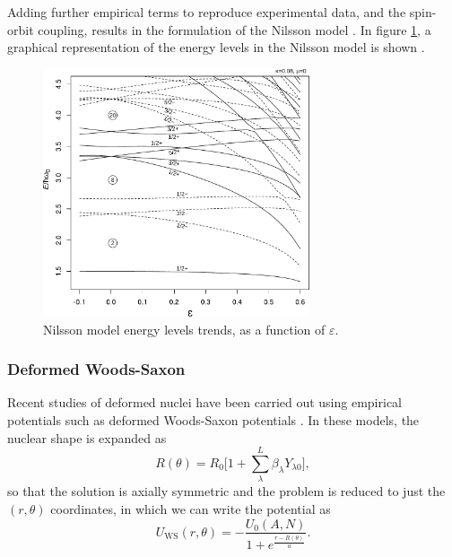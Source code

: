 Adding further empirical terms to reproduce experimental data, and the spin-orbit coupling, results in the formulation of the Nilsson model \cite{nilsson}. In figure \ref{fig:nilsson}, a graphical representation of the energy levels in the Nilsson model is shown \cite{wikipedia_equation_of_state}.
\begin{figure}[h]
    \centering
    \includegraphics[width=0.7\textwidth]{Images/nilsson.pdf}
    \caption{Nilsson model energy levels trends, as a function of $\varepsilon$.}
    \label{fig:nilsson}
\end{figure}
\subsubsection{Deformed Woods-Saxon}
Recent studies of deformed nuclei have been carried out using empirical potentials such as deformed Woods-Saxon potentials \cite{def_WS_dudek,defWSfissionbarriers}. In these models, the nuclear shape is expanded as 
\begin{equation}
R(\theta) = R_0\bigg[1+\sum_{\lambda}^L \beta_{\lambda}Y_{\lambda 0}\bigg],
\end{equation}
so that the solution is axially symmetric and the problem is reduced to just the $(r, \theta)$ coordinates, in which we can write the potential as
\begin{equation}
    \label{eq:def_WS}
    U_\text{WS}(r, \theta) = -\frac{U_0(A, N)}{1+e^\frac{r - R(\theta)}{a}}.
\end{equation}
